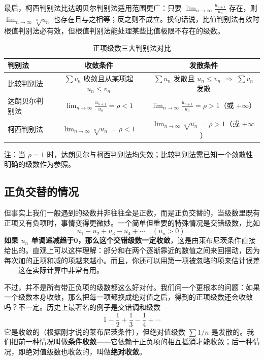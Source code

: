 \documentclass[UTF8]{ctexbook}
\begin{document}
最后，柯西判别法比达朗贝尔判别法适用范围更广：只要 $\lim_{n\to\infty} \frac{u_{n+1}}{u_n}$ 存在，则 $\lim_{n\to\infty} \sqrt[n]{u_n}$ 也存在且与之相等；反之则不成立。换句话说，比值判别法有效时根值判别法必有效，但根值判别法能处理某些比值极限不存在的级数。

\begin{table}[h]
\centering
\caption{正项级数三大判别法对比}
\begin{tabular}{lcc}
\toprule
\textbf{判别法} & \textbf{收敛条件} & \textbf{发散条件} \\
\midrule
比较判别法 & $\sum v_n$ 收敛且从某项起 $u_n \le v_n$  & $\sum u_n$ 发散且 $u_n \le v_n$ $\Rightarrow$ $\sum v_n$ 发散 \\
达朗贝尔判别法 & $\displaystyle \lim_{n\to\infty} \frac{u_{n+1}}{u_n} = \rho < 1$ & $\displaystyle \lim_{n\to\infty} \frac{u_{n+1}}{u_n} = \rho > 1$（或 $+\infty$） \\
柯西判别法 & $\displaystyle \lim_{n\to\infty} \sqrt[n]{u_n} = \rho < 1$ & $\displaystyle \lim_{n\to\infty} \sqrt[n]{u_n} = \rho > 1$（或 $+\infty$） \\
\bottomrule
\end{tabular}
\begin{center}
\scriptsize 注：当 $\rho = 1$ 时，达朗贝尔与柯西判别法均失效；比较判别法需已知一个敛散性明确的级数作为参照。
\end{center}
\end{table}

\subsection{正负交替的情况}

但事实上我们一般遇到的级数并非往往全是正数，而是正负交替的，当级数里既有正项又有负项时，事情变得更微妙。一个简单但重要的特殊情况是交错级数，比如
\[
u_1 - u_2 + u_3 - u_4 + \cdots \quad (u_n > 0).
\]
\textbf{如果 $u_n$ 单调递减趋于0，那么这个交错级数一定收敛}，这是由莱布尼茨条件直接给出的。直观上可以这样理解：部分和在两个逐渐靠近的数值之间来回摆动，因为每次加的正项和减的项越来越小。而且，你还可以用第一项被忽略的项来估计误差——这在实际计算中非常有用。

不过，并不是所有带正负项的级数都这么好对付。我们问一个更根本的问题：如果一个级数本身收敛，那么把每一项都换成绝对值之后，得到的正项级数还会收敛吗？不一定。历史上最著名的例子是交错调和级数
\[
1 - \frac12 + \frac13 - \frac14 + \cdots
\]
它是收敛的（根据刚才说的莱布尼茨条件），但绝对值级数 $\sum 1/n$ 是发散的。我们把前一种情况叫做\textbf{条件收敛}——它依赖于正负项的相互抵消才能收敛；后一种情况，即绝对值级数也收敛的，叫做\textbf{绝对收敛}。
\end{document}

